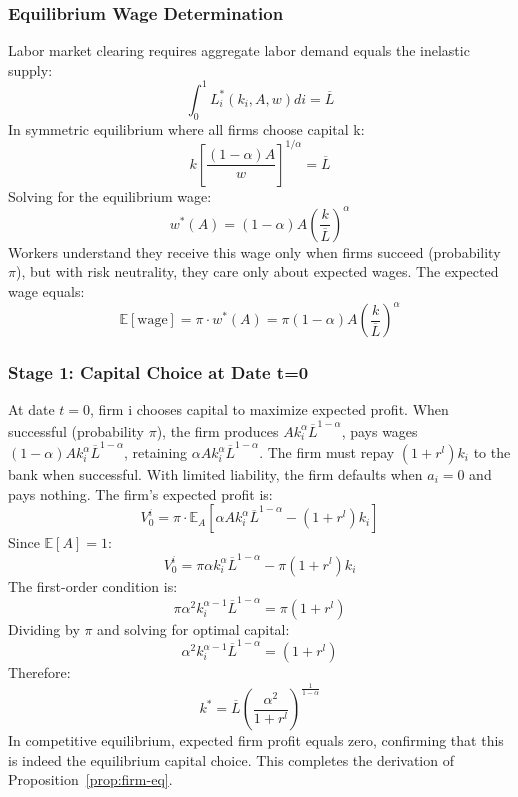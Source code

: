 \documentclass[12pt]{article}
\begin{document}
\subsubsection{Equilibrium Wage Determination}
Labor market clearing requires aggregate labor demand equals the inelastic supply:
\begin{equation}
\int_{0}^{1} L_{i}^{*}(k_{i},A,w)di = \overline{L}
\end{equation}
In symmetric equilibrium where all firms choose capital k:
\begin{equation}
k\left[\frac{(1-\alpha)A}{w}\right]^{1/\alpha} = \overline{L}
\end{equation}
Solving for the equilibrium wage:
\begin{equation}
w^{*}(A) = (1-\alpha)A\left(\frac{k}{\overline{L}}\right)^{\alpha}
\end{equation}
Workers understand they receive this wage only when firms succeed (probability $\pi$), but with risk neutrality, they care only about expected wages. The expected wage equals:
\begin{equation}
\mathbb{E}[\text{wage}] = \pi \cdot w^{*}(A) = \pi(1-\alpha)A\left(\frac{k}{\overline{L}}\right)^{\alpha}
\end{equation}

\subsubsection{Stage 1: Capital Choice at Date t=0}
At date $t=0$, firm i chooses capital to maximize expected profit. When successful (probability $\pi$), the firm produces $Ak_{i}^{\alpha}\overline{L}^{1-\alpha}$, pays wages $(1-\alpha)Ak_{i}^{\alpha}\overline{L}^{1-\alpha}$, retaining $\alpha Ak_{i}^{\alpha}\overline{L}^{1-\alpha}$. The firm must repay $(1+r^{l})k_{i}$ to the bank when successful. With limited liability, the firm defaults when $a_{i}=0$ and pays nothing. The firm's expected profit is:
\begin{equation}
V_{0}^{i} = \pi \cdot \mathbb{E}_{A}[\alpha Ak_{i}^{\alpha}\overline{L}^{1-\alpha} - (1+r^{l})k_{i}]
\end{equation}
Since $\mathbb{E}[A]=1$:
\begin{equation}
V_{0}^{i} = \pi\alpha k_{i}^{\alpha}\overline{L}^{1-\alpha} - \pi(1+r^{l})k_{i}
\end{equation}
The first-order condition is:
\begin{equation}
\pi\alpha^{2}k_{i}^{\alpha-1}\overline{L}^{1-\alpha} = \pi(1+r^{l})
\end{equation}
Dividing by $\pi$ and solving for optimal capital:
\begin{equation}
\alpha^{2}k_{i}^{\alpha-1}\overline{L}^{1-\alpha} = (1+r^{l})
\end{equation}
Therefore:
\begin{equation}
k^{*} = \overline{L}\left(\frac{\alpha^{2}}{1+r^{l}}\right)^{\frac{1}{1-\alpha}}
\end{equation}
In competitive equilibrium, expected firm profit equals zero, confirming that this is indeed the equilibrium capital choice. This completes the derivation of Proposition~\ref{prop:firm-eq}.
\end{document}
